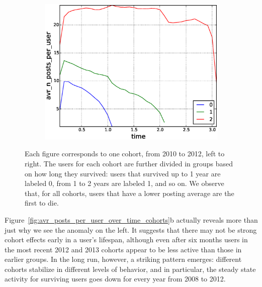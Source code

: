 \begin{figure}[!tb]
\begin{subfigure}{.3\textwidth}\includegraphics[scale=0.25]{./images/avr_posts_per_user_for_surviving_year_for_2012.eps}\caption{}\end{subfigure}
\caption{Each figure corresponds to one cohort, from 2010 to 2012, left to right. The users for each cohort are further divided in groups based on how long they survived: users that survived up to 1 year are labeled 0, from 1 to 2 years are labeled 1, and so on. We observe that, for all cohorts, users that have a lower posting average are the first to die.}
\label{fig:avr_posts_per_user_for_surviving_year}
\end{figure}


Figure~\ref{fig:avr_posts_per_user_over_time_cohorts}b actually reveals more than just why we see the anomaly on the left. It suggests that there may not be strong cohort effects early in a user's lifespan, although even after six months users in the most recent 2012 and 2013 cohorts appear to be less active than those in earlier groups.  In the long run, however, a striking pattern emerges: different cohorts stabilize in different levels of behavior, and in particular, the steady state activity for surviving users goes down for every year from 2008 to 2012.

